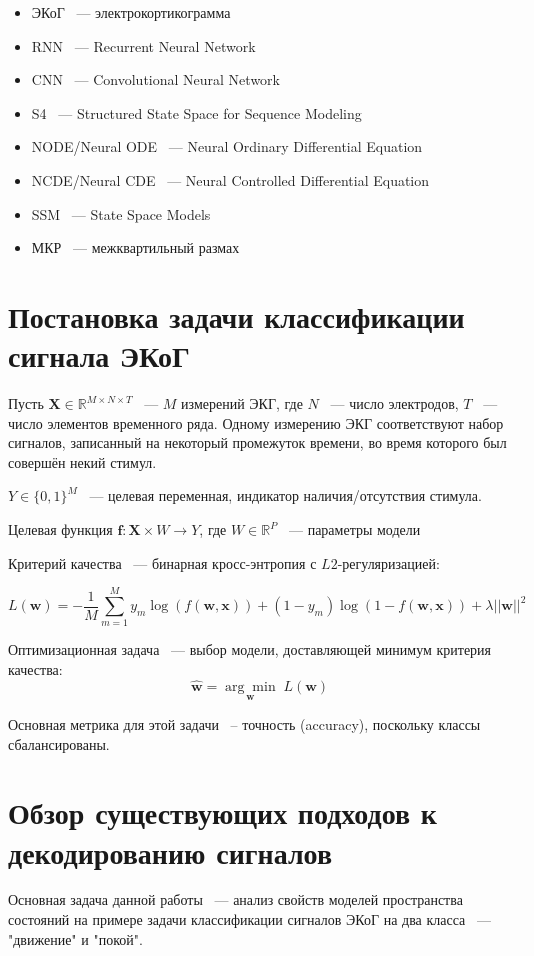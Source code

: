 \documentclass[a4paper, 12pt]{article}
\newcommand{\bx}{\mathbf{x}}
\newcommand{\bw}{\mathbf{w}}
\newcommand{\bff}{\mathbf{f}}
\newcommand{\bX}{\mathbf{X}}
\newcommand{\dR}{\mathds{R}}
\begin{document}
	\begin{itemize}
		\item[] ЭКоГ ~--- электрокортикограмма
		\item[] RNN ~--- Recurrent Neural Network
		\item[] CNN ~--- Convolutional Neural Network
		\item[] S4 ~--- Structured State Space for Sequence Modeling
		\item[] NODE/Neural ODE ~--- Neural Ordinary Differential Equation
		\item[] NCDE/Neural CDE ~--- Neural Controlled Differential Equation
		\item[] SSM ~--- State Space Models
		\item[] МКР ~--- межквартильный размах
	\end{itemize}
	
	\section{Постановка задачи классификации сигнала ЭКоГ}
	
	Пусть $\bX \in \dR^{M \times N \times T}$ ~--- $M$ измерений ЭКГ, где $N$ ~--- число электродов, $T$ ~--- число элементов временного ряда. Одному измерению ЭКГ соответствуют набор сигналов, записанный на некоторый промежуток времени, во время которого был совершён некий стимул.
	
	$Y \in \{ 0, 1\}^M$ ~--- целевая переменная, индикатор наличия/отсутствия стимула.
	
	Целевая функция $ \bff: \bX \times W \to Y$, где $W \in \dR^P$ ~--- параметры модели
	
	Критерий качества ~--- бинарная кросс-энтропия с $L2$-регуляризацией:  
	
	$$ L(\bw) = -\dfrac{1}{M} \sum\limits_{m=1}^M y_m \log(f(\bw, \bx)) + (1 - y_m) \log(1 - f(\bw, \bx)) + \lambda ||\bw||^2$$
	
	Оптимизационная задача ~--- выбор модели, доставляющей минимум критерия качества: $$\hat{\bw} = \underset{\bw}{\arg \min} \; L(\bw)$$
	
	Основная метрика для этой задачи ~-- точность (accuracy), поскольку классы сбалансированы.
	\section{Обзор существующих подходов к декодированию сигналов}
	Основная задача данной работы ~--- анализ свойств моделей пространства состояний на примере задачи классификации сигналов ЭКоГ на два класса ~--- "движение" и "покой". 
	
\end{document}
